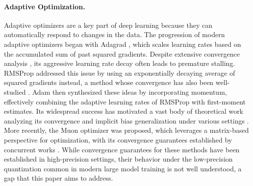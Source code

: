 \documentclass[11pt, letterpaper]{article}
\begin{document}
\paragraph{Adaptive Optimization.} Adaptive optimizers are a key part of deep learning because they can automatically respond to changes in the data. The progression of modern adaptive optimizers began with Adagrad \citep{duchi2011adaptive}, which scales learning rates based on the accumulated sum of past squared gradients. Despite extensive convergence analysis \citep{zou2019sufficient,chen2018convergence,shi2020rmsprop,adagrad_non_convex_orabona,faw_adapt}, its aggressive learning rate decay often leads to premature stalling. RMSProp \citep{hinton2012lecture} addressed this issue by using an exponentially decaying average of squared gradients instead, a method whose convergence has also been well-studied \citep{zaheer2018adaptive,de2018convergence,shi2020rmsprop,zhouchenlinprop}. Adam \citep{kingma2014adam} then synthesized these ideas by incorporating momentum, effectively combining the adaptive learning rates of RMSProp with first-moment estimates. Its widespread success has motivated a vast body of theoretical work analyzing its convergence and implicit bias generalization under various settings \citep{reddi2018,defossez2022a,zou2019sufficient,chen2018convergence,zhang2022adam,wang2022provable,guo2021novel,hong2023high,li2023convergence,wang2023closing,zhang2025convergenceguaranteesrmspropadam,zhang2024implicit,zou2023understanding,cattaneo2024implicit}. More recently, the Muon optimizer \citep{jordan2024muon} was proposed, which leverages a matrix-based perspective for optimization, with its convergence guarantees established by concurrent works \citep{shen2025convergence,sato2025convergenceboundcriticalbatch}. 
While convergence guarantees for these methods have been established in high-precision settings, their behavior under the low-precision quantization common in modern large model training is not well understood, a gap that this paper aims to address.
\end{document}
